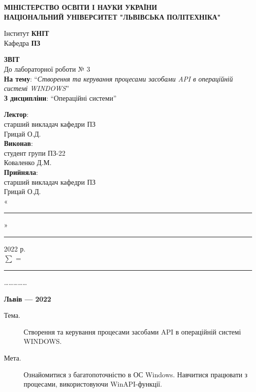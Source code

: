 \documentclass{article}
\newcommand\subject{Операційні системи}
\newcommand\lecturer{старший викладач кафедри ПЗ\\Грицай О.Д.}
\newcommand\teacher{старший викладач кафедри ПЗ\\Грицай О.Д.}
\newcommand\mygroup{ПЗ-22}
\newcommand\lab{3}
\newcommand\theme{Створення та керування процесами засобами API в операційній
	системі WINDOWS}
\newcommand\purpose{Ознайомитися з багатопоточністю в ОС Windows. Навчитися
	працювати з процесами, використовуючи WinAPI-функції}
\begin{document}
\begin{normalsize}
	\begin{titlepage}
		\thispagestyle{empty}
		\begin{center}
			\textbf{МІНІСТЕРСТВО ОСВІТИ І НАУКИ УКРАЇНИ\\
				НАЦІОНАЛЬНИЙ УНІВЕРСИТЕТ "ЛЬВІВСЬКА ПОЛІТЕХНІКА"}
		\end{center}
		\begin{flushright}
			Інститут \textbf{КНІТ}\\
			Кафедра \textbf{ПЗ}
		\end{flushright}
		\vspace{200pt}
		\begin{center}
			\textbf{ЗВІТ}\\
			\vspace{10pt}
			До лабораторної роботи № \lab\\
			\textbf{На тему}: “\textit{\theme}”\\
			\textbf{З дисципліни}: “\subject”
		\end{center}
		\vspace{112pt}
		\begin{flushright}
			
			\textbf{Лектор}:\\
			\lecturer\\
			\vspace{28pt}
			\textbf{Виконав}:\\
			
			студент групи \mygroup\\
			Коваленко Д.М.\\
			\vspace{28pt}
			\textbf{Прийняла}:\\
			
			\teacher\\
			
			\vspace{28pt}
			«\rule{1cm}{0.15mm}» \rule{1.5cm}{0.15mm} 2022 р.\\
			$\sum$ = \rule{1cm}{0.15mm}……………\\
			
		\end{flushright}
		\vspace{\fill}
		\begin{center}
			\textbf{Львів — 2022}
		\end{center}
	\end{titlepage}
		
	\begin{description}
		\item[Тема.] \theme.
		\item[Мета.] \purpose.
	\end{description}


\end{normalsize}
\end{document}

